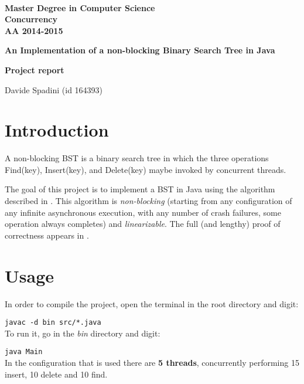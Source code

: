 \documentclass[a4paper]{article}
\begin{document}
\begin{centering}
~~~~~~~~~~~~~\\[-20mm]

  {
  \bfseries Master Degree in Computer Science\\[3mm]
  Concurrency\\[3mm]
  AA 2014-2015
  }\\[1mm]


  \vspace{0.5cm}
  {
  \Large \bfseries{An Implementation of a non-blocking Binary Search Tree in Java} \par
  }
  \vspace{0.2cm}
  {
  \small \bfseries{Project report} \par
  }
  \vspace{0.2cm}

  {Davide Spadini (id 164393)}

  \vspace{0.3cm}
\end{centering}



\section{Introduction}\label{introduction}
A non-blocking \ac{BST} is a binary search tree in which the three operations Find(key), Insert(key), and Delete(key) maybe invoked by concurrent threads.

The goal of this project is to implement a \ac{BST} in Java using the algorithm described in \cite{algorithm}. 
This algorithm is \emph{non-blocking} (starting from any configuration of any infinite asynchronous execution, with any number of crash failures, some operation always completes) and \emph{linearizable}. The full (and lengthy) proof of correctness appears in \cite{proof}.

\section{Usage} %
\label{sec:usage}

In order to compile the project, open the terminal in the root directory and digit:

\verb|javac -d bin src/*.java|
\\
\noindent
To run it, go in the \emph{bin} directory and digit:

\verb|java Main|
\\
\noindent
In the configuration that is used there are \textbf{5 threads}, concurrently performing 15 insert, 10 delete and 10 find.
\end{document}
